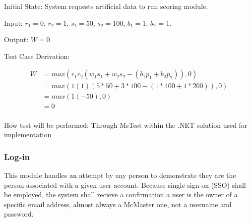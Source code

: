 \documentclass[12pt, titlepage]{article}
\begin{document}
\begin{enumerate}
Initial State: System requests artificial data to run scoring module.
					
Input: $r_1 = 0$, $r_2 = 1$, $s_1 = 50$, $s_2 = 100$, $b_1 = 1$, $b_2$ = 1.
					
Output: $W = 0$

Test Case Derivation: 

\begin{align*}
W &= max(r_1r_2(w_1s_1 + w_2s_2 - (b_1p_1 + b_2p_2)), 0) \\
  &= max(1(1)(5*50 + 3*100 - (1*400 + 1*200)), 0) \\
  &= max(1(-50), 0) \\
  &= 0 \\
\end{align*}

How test will be performed: Through MsTest within the .NET solution used for implementation
    
\end{enumerate}

\subsubsection{Log-in}

This module handles an attempt by any person to demonstrate they are the person associated with
a given user account. Because single sign-on (SSO) shall be employed, the system shall recieve
a confirmation a user is the owner of a specific email address, almost always a McMaster one, not a username
and password.
\end{document}
